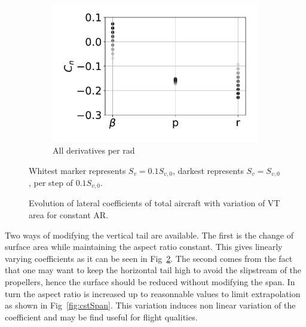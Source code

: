 \begin{figure}[hbt!]
\begin{subfigure}[b]{0.33\textwidth}
		\includegraphics[width=1.0\textwidth]{CnCstAR}
		\caption{All derivatives per rad}
		\label{fig:CnCstAR}
	\end{subfigure}
	\caption{Evolution of lateral coefficients of total aircraft with variation of VT area for constant AR.} Whitest marker represents $S_v=0.1S_{v,0}$, darkest represents $S_v=S_{v,0}$, per step of $0.1S_{v,0}$.\label{fig:cstAR}
\end{figure}

Two ways of modifying the vertical tail are available. The first is the change of surface area while maintaining the aspect ratio constant. This gives linearly varying coefficients as it can be seen in Fig~\ref{fig:cstAR}. The second comes from the fact that one may want to keep the horizontal tail high to avoid the slipstream of the propellers, hence the surface should be reduced without modifying the span. In turn the aspect ratio is increased up to reasonnable values to limit extrapolation as shown in Fig~\ref{fig:cstSpan}. This variation induces non linear variation of the coefficient and may be find useful for flight qualities.


